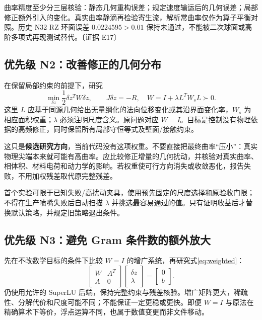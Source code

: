\documentclass[UTF8,a4paper,11pt,fontset=fandol]{ctexart}
\newcommand{\ev}[1]{{\small\color{muted}〔证据 #1〕}}
\begin{document}
曲率精度至少分三层核验：静态几何重构误差；规定速度输运后的几何误差；局部修正额外引入的变化。真实曲率静滴再检验寄生流，解析常曲率仅作为算子平衡对照。历史 N32 RZ 环面误差 $0.0224595>0.01$ 保持未通过，不能被二次球面或高阶多项式再现测试替代。\ev{E17}

\subsection{优先级 N2：改善修正的几何分布}
在保留局部约束的前提下，研究
\begin{equation}
 \min_{\delta z}\frac12\delta z^TW\delta z,
 \qquad J\delta z=-R,
 \quad W=I+\lambda L^T W_s L\succ0.
 \label{eq:weighted}
\end{equation}
这里 $L$ 应基于同源几何给出无量纲化的法向位移变化或其沿界面变化率，$W_s$ 为相应面积权重；$\lambda$ 必须注明尺度含义。原问题对应 $W=I$。目标是控制没有物理依据的高频修正，同时保留所有局部守恒等式及壁面/接触约束。

这只是\textbf{候选研究方向}，当前代码没有这项权重。不要直接把最终曲率“压小”：真实物理尖端本来就可能有高曲率。应比较修正增量的几何扰动，并核验对真实曲率、相体积、材料电荷和动力学的影响。若权重使可行方向消失或收敛恶化，报告失败，不用加权残差取代原完整残差。

首个实验可限于已知失败/高扰动夹具，使用预先固定的尺度选择和原验收门限；不得在生产喷嘴失败后自动扫描 $\lambda$ 并挑选最容易通过的值。只有证明收益后才替换默认策略，并规定旧策略退出条件。

\subsection{优先级 N3：避免 Gram 条件数的额外放大}
先在不改数学目标的条件下比较 $W=I$ 的增广系统，再研究式\eqref{eq:weighted}：
\begin{equation}
 \begin{bmatrix}W&A^T\\A&0\end{bmatrix}
 \begin{bmatrix}\delta z\\\lambda\end{bmatrix}
 =\begin{bmatrix}0\\b\end{bmatrix}.
\end{equation}
仍使用允许的 SuperLU 后端，保持完整约束与残差核验。增广矩阵更大，稀疏性、分解代价和尺度可能不同；不能保证一定更稳或更快。即便 $W=I$ 与原法在精确算术下等价，浮点运算不同，也属于数值变更而非文件移动。
\end{document}
